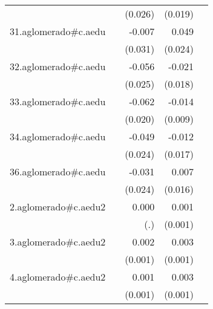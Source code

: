 {\begin{longtable}{l*{4}{D{.}{.}{-1}}}
            &                     &     (0.026)         &     (0.019)         &                     \\
\addlinespace
31.aglomerado#c.aedu&                     &      -0.007         &       0.049\sym{*}  &                     \\
            &                     &     (0.031)         &     (0.024)         &                     \\
\addlinespace
32.aglomerado#c.aedu&                     &      -0.056\sym{*}  &      -0.021         &                     \\
            &                     &     (0.025)         &     (0.018)         &                     \\
\addlinespace
33.aglomerado#c.aedu&                     &      -0.062\sym{**} &      -0.014         &                     \\
            &                     &     (0.020)         &     (0.009)         &                     \\
\addlinespace
34.aglomerado#c.aedu&                     &      -0.049\sym{*}  &      -0.012         &                     \\
            &                     &     (0.024)         &     (0.017)         &                     \\
\addlinespace
36.aglomerado#c.aedu&                     &      -0.031         &       0.007         &                     \\
            &                     &     (0.024)         &     (0.016)         &                     \\
\addlinespace
2.aglomerado#c.aedu2&                     &       0.000         &       0.001         &                     \\
            &                     &         (.)         &     (0.001)         &                     \\
\addlinespace
3.aglomerado#c.aedu2&                     &       0.002         &       0.003\sym{**} &                     \\
            &                     &     (0.001)         &     (0.001)         &                     \\
\addlinespace
4.aglomerado#c.aedu2&                     &       0.001         &       0.003\sym{***}&                     \\
            &                     &     (0.001)         &     (0.001)         &                     \\

\end{longtable}}
